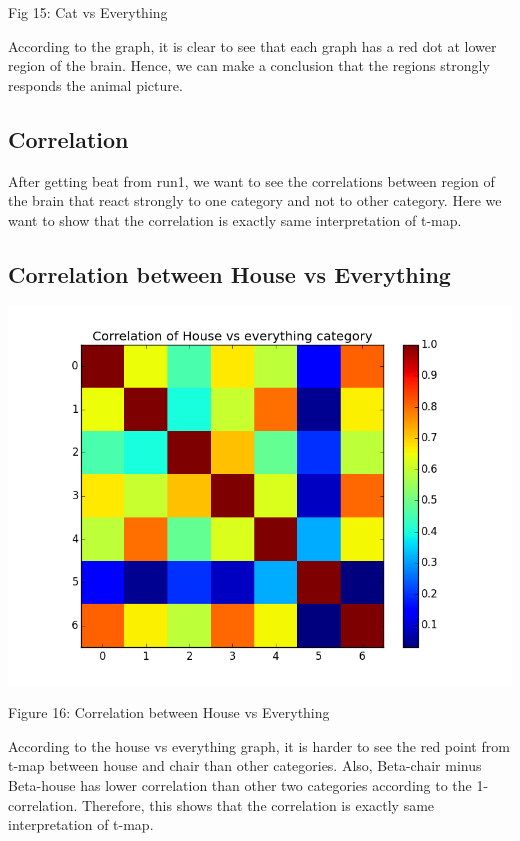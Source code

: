 \documentclass[12pt]{article}
\begin{document}
\begin{housevseverything}
\begin{housevseverything}
        Fig 15: Cat vs Everything

According to the graph, it is clear to see that each graph has a red dot at lower region of the brain. Hence, we can make a conclusion that the regions strongly responds the animal picture.

\subsection{Correlation}

After getting beat from run1, we want to see the correlations between  region of the brain that react strongly to one category and not to other category. Here we want to show that the correlation is exactly same interpretation  of t-map.


\subsection{Correlation between House vs Everything}
\begin{housevseverything}
    \centering
      \includegraphics{corr_House_vs_everything}
    \caption{Figure 16: Correlation between House vs Everything}
\end{housevseverything}

According to the house vs everything graph, it is harder to see the red point from t-map between house and chair than other categories. Also, Beta-chair  minus Beta-house has lower correlation than other two categories according to the 1-correlation. Therefore,  this shows that the correlation is exactly same interpretation  of t-map. 


\end{housevseverything}
\end{housevseverything}
\end{document}
